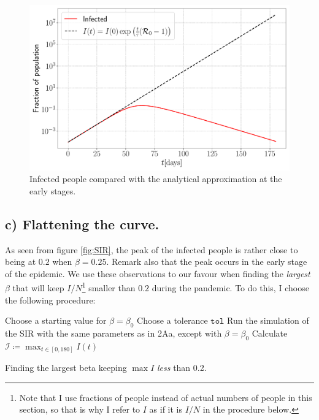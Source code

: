 \begin{figure}[htb]
	\centering
	\includegraphics[width=0.8\columnwidth]{../fig/2Ab_I.pdf}
	\caption{Infected people compared with the analytical approximation at the early stages.}
	\label{fig:Infected}
\end{figure}

\subsection{c) Flattening the curve. }

As seen from figure \ref{fig:SIR}, the peak of the infected people is rather close to being at $0.2$ when $\beta = 0.25$. Remark also that the peak occurs in the early stage of the epidemic. We use these observations to our favour when finding the \textit{largest} $\beta$ that will keep $I/N$\footnote{Note that I use fractions of people instead of actual numbers of people in this section, so that is why I refer to $I$ as if it is $I/N$ in the procedure below.} smaller than $0.2$ during the pandemic. To do this, I choose the following procedure:

\begin{algorithm}[H]
	Choose a starting value for $\beta = \beta_0$\;
	Choose a tolerance $\texttt{tol}$\;
	Run the simulation of the SIR with the same parameters as in 2Aa, except with $\beta = \beta_0$\;
	Calculate $\mathcal{I} \coloneqq \max_{t\in[0,180]} I(t)$\;
		
	\caption{Finding the largest beta keeping $\max I$ \textit{less} than 0.2.}
\end{algorithm} 

